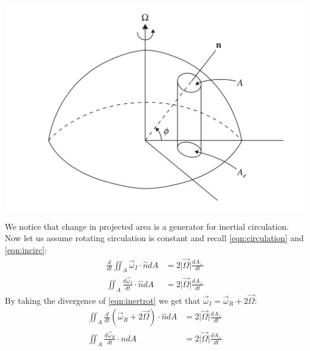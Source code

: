 \begin{minipage}{0.49\textwidth}
    \vspace{-2ex}
    \begin{center}
        \includegraphics[width=\linewidth]{assets/circulation.png}
        \label{fig:circulation}
    \end{center}
\end{minipage}\hspace{0.05\textwidth}
\begin{minipage}{0.49\textwidth}
    We notice that change in projected area is a generator for inertial circulation. Now let us assume rotating circulation is constant and recall \ref{eqn:circulation} and \ref{eqn:incirc}:
    \begin{align*}
        \frac{d}{dt}\iint_A \Vec{\omega}_I\cdot\hat{n}dA &=  2\vert \Vec{\Omega}\vert \frac{dA_\perp}{dt}\\
        \iint_A \frac{d\Vec{\omega}_I}{dt}\cdot\hat{n}dA &= 2\vert \Vec{\Omega}\vert \frac{dA_\perp}{dt}
    \end{align*}
    By taking the divergence of \ref{eqn:inertrot} we get that $\Vec{\omega}_I=\Vec{\omega}_R+2\vec{\Omega}$:
    \begin{align*}
        \iint_A \frac{d}{dt}\left(\Vec{\omega}_R+2\Vec{\Omega}\right)\cdot\hat{n}dA &= 2\vert \Vec{\Omega}\vert \frac{dA_\perp}{dt}\\
        \iint_A \frac{d\vec{\omega}_R}{dt}\cdot\hat{n}dA &= 2\vert \Vec{\Omega}\vert \frac{dA_\perp}{dt}
    \end{align*}
\end{minipage}
\vspace{5mm}

